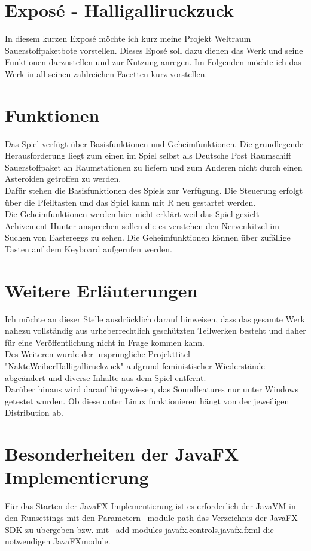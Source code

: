 \documentclass{article}
\begin{document}
	\section*{Exposé - Halligalliruckzuck}
	In diesem kurzen Exposé möchte ich kurz meine Projekt Weltraum Sauerstoffpaketbote vorstellen.
	Dieses Eposé soll dazu dienen das Werk und seine Funktionen darzustellen und zur Nutzung anregen. Im Folgenden möchte ich das Werk in all seinen zahlreichen Facetten kurz vorstellen.
	\section*{Funktionen}
	Das Spiel verfügt über Basisfunktionen und Geheimfunktionen. Die grundlegende Herausforderung liegt zum einen im Spiel selbst als Deutsche Post Raumschiff Sauerstoffpaket an Raumstationen zu liefern und zum Anderen nicht durch einen Asteroiden getroffen zu werden. \\
	Dafür stehen die Basisfunktionen des Spiels zur Verfügung. Die Steuerung erfolgt über die Pfeiltasten und das Spiel kann mit R neu gestartet werden. \\
	Die Geheimfunktionen werden hier nicht erklärt weil das Spiel gezielt Achivement-Hunter ansprechen sollen die es verstehen den Nervenkitzel im Suchen von Eastereggs zu sehen. Die Geheimfunktionen können über zufällige Tasten auf dem Keyboard aufgerufen werden.
	\section*{Weitere Erläuterungen}
	Ich möchte an dieser Stelle ausdrücklich darauf hinweisen, dass das gesamte Werk nahezu vollständig aus urheberrechtlich geschützten Teilwerken besteht und daher für eine Veröffentlichung nicht in Frage kommen kann. \\
	Des Weiteren wurde der ursprüngliche Projekttitel "NakteWeiberHalligalliruckzuck" aufgrund feministischer Wiederstände abgeändert und diverse Inhalte aus dem Spiel entfernt. \\
	Darüber hinaus wird darauf hingewiesen, das Soundfeatures nur unter Windows getestet wurden. Ob diese unter Linux funktionieren hängt von der jeweiligen Distribution ab.
	\section*{Besonderheiten der JavaFX Implementierung}
	Für das Starten der JavaFX Implementierung ist es erforderlich der JavaVM in den Runsettings mit den Parametern --module-path das Verzeichnis der JavaFX SDK zu übergeben bzw. mit --add-modules javafx.controls,javafx.fxml die notwendigen JavaFXmodule.
\end{document}
